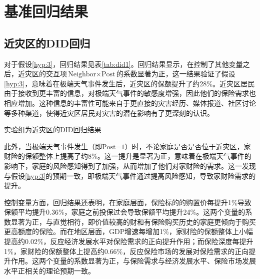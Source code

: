 \section{基准回归结果}

%     

\subsection{近灾区的DID回归}
对于假设\ref{hyp:3}，回归结果见表\ref{tab:did1}。回归结果显示，在控制了其他变量之后，近灾区的交互项$\text{Neighbor}\times \text{Post}$的系数显著为正，这一结果验证了假设\ref{hyp:3}，意味着在极端天气事件发生后，近灾区的保额提升了约28\%。近灾区居民由于接收到更丰富的信息，对极端天气事件的敏感度增强，因此他们的保险需求也相应增加。这种信息的丰富性可能来自于更直接的灾害经历、媒体报道、社区讨论等多种渠道，使得近灾区居民对灾害的潜在影响有了更深刻的认识。
\begin{table}[H]
    \centering
    \caption{实验组为近灾区的DID回归结果}\label{tab:did1}
    
\end{table}

此外，当极端天气事件发生（即$\text{Post=1}$）时，不论家庭是否是否位于近灾区，家财险的保额整体上提高了约8\%。这一提升是显著为正，意味着在极端天气事件的影响下，家庭的风险感知得到了加强，从而增加了他们对家财险的需求。这一发现与假设\ref{hyp:3}的预期一致，即极端天气事件通过提高风险感知，导致家财险需求的提升。

控制变量方面，回归结果还表明，在家庭层面，保险标的的购置价每提升1\%导致保额平均提升0.36\%，家庭之前投保过会导致保额平均提升24\%。这两个变量的系数显著为正，与直觉相符，即价值较高的财和有保险购买历史的家庭更倾向于购买更高额度的保险。而在地区层面，GDP增速每增加1\%，家财险的保额整体上小幅提高约0.02\%，反应经济发展水平对保险需求的正向提升作用\citep{JJYJ200401002,arena2008does}；而保险深度每提升1\%，家财险的保额整体上提高约0.66\%，反应保险市场的发展对保险需求的正向提升作用\citep{JRYJ200706018}。这两个变量的系数显著为正，与保险需求与经济发展水平、保险市场发展水平正相关的理论预期一致。


